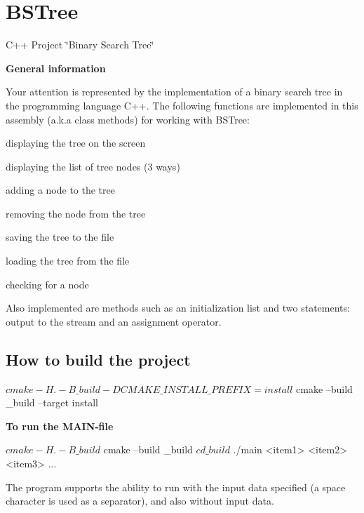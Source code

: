 \href{https://travis-ci.org/WhiteRabbitRo/BSTree}{\tt }

\section*{B\+S\+Tree}

C++ Project \char`\"{}\+Binary Search Tree\char`\"{}

{\bfseries General information}

Your attention is represented by the implementation of a binary search tree in the programming language C++. The following functions are implemented in this assembly (a.\+k.\+a class methods) for working with B\+S\+Tree\+:


\begin{DoxyItemize}
\item displaying the tree on the screen
\item displaying the list of tree nodes (3 ways)
\item adding a node to the tree
\item removing the node from the tree
\item saving the tree to the file
\item loading the tree from the file
\item checking for a node
\end{DoxyItemize}

Also implemented are methods such as an initialization list and two statements\+: output to the stream and an assignment operator.

\subsection*{How to build the project}


\begin{DoxyCode}
$ cmake -H. -B\_build -DCMAKE\_INSTALL\_PREFIX=install
$ cmake --build \_build --target install
\end{DoxyCode}


{\bfseries To run the M\+A\+I\+N-\/file}


\begin{DoxyCode}
$ cmake -H. -B\_build
$ cmake --build \_build
$ cd \_build
$ ./main <item1> <item2> <item3> ...
\end{DoxyCode}


The program supports the ability to run with the input data specified (a space character is used as a separator), and also without input data.

